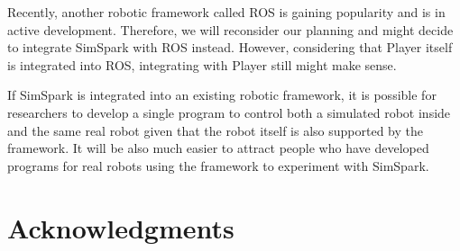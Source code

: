 \documentclass{llncs}
\begin{document}
Recently, another robotic framework called ROS is gaining popularity and is in
active development. Therefore, we will reconsider our planning and might decide
to integrate SimSpark with ROS instead. However, considering that Player itself
is integrated into ROS, integrating with Player still might make sense. 

If SimSpark is integrated into an existing robotic framework, it is possible 
for researchers to develop a single program to control both a simulated 
robot inside and the same real robot given that the robot itself is also
supported by the framework. It will be also much easier to attract people 
who have developed programs for real robots using the framework to experiment
with SimSpark.

\section*{Acknowledgments}



\end{document}
